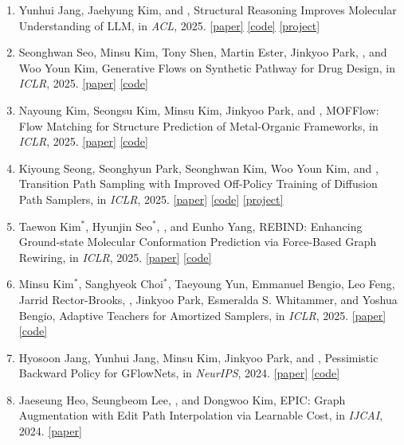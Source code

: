 \begin{enumerate}
\item Yunhui Jang, Jaehyung Kim, and , Structural Reasoning Improves Molecular Understanding of LLM, in \textit{ACL}, 2025. \mbox{\href{https://arxiv.org/abs/2410.05610}{[paper]}} \mbox{\href{https://github.com/yunhuijang/MSR}{[code]}} \mbox{\href{https://yunhuijang.github.io/projects/MSR/}{[project]}}
\item Seonghwan Seo, Minsu Kim, Tony Shen, Martin Ester, Jinkyoo Park, , and Woo Youn Kim, Generative Flows on Synthetic Pathway for Drug Design, in \textit{ICLR}, 2025. \mbox{\href{https://arxiv.org/abs/2410.04542}{[paper]}} \mbox{\href{https://github.com/SeonghwanSeo/RxnFlow}{[code]}}
\item Nayoung Kim, Seongsu Kim, Minsu Kim, Jinkyoo Park, and , MOFFlow: Flow Matching for Structure Prediction of Metal-Organic Frameworks, in \textit{ICLR}, 2025. \mbox{\href{https://arxiv.org/abs/2410.17270}{[paper]}} \mbox{\href{https://github.com/nayoung10/MOFFlow}{[code]}}
\item Kiyoung Seong, Seonghyun Park, Seonghwan Kim, Woo Youn Kim, and , Transition Path Sampling with Improved Off-Policy Training of Diffusion Path Samplers, in \textit{ICLR}, 2025. \mbox{\href{https://arxiv.org/abs/2405.19961}{[paper]}} \mbox{\href{https://github.com/kiyoung98/tps-dps}{[code]}} \mbox{\href{https://kiyoung98.github.io/tps-dps/}{[project]}}
\item Taewon Kim$^*$, Hyunjin Seo$^*$, , and Eunho Yang, REBIND: Enhancing Ground-state Molecular Conformation Prediction via Force-Based Graph Rewiring, in \textit{ICLR}, 2025. \mbox{\href{https://arxiv.org/abs/2410.14696}{[paper]}} \mbox{\href{https://github.com/holymollyhao/ReBIND}{[code]}}
\item Minsu Kim$^*$, Sanghyeok Choi$^*$, Taeyoung Yun, Emmanuel Bengio, Leo Feng, Jarrid Rector-Brooks, , Jinkyoo Park, Esmeralda S. Whitammer, and Yoshua Bengio, Adaptive Teachers for Amortized Samplers, in \textit{ICLR}, 2025. \mbox{\href{https://arxiv.org/abs/2410.01432}{[paper]}} \mbox{\href{https://github.com/alstn12088/adaptive-teacher}{[code]}}
\item Hyosoon Jang, Yunhui Jang, Minsu Kim, Jinkyoo Park, and , Pessimistic Backward Policy for GFlowNets, in \textit{NeurIPS}, 2024. \mbox{\href{https://arxiv.org/abs/2405.16012}{[paper]}} \mbox{\href{https://github.com/hsjang0/Pessimistic-Backward-Policy-for-GFlowNets}{[code]}}
\item Jaeseung Heo, Seungbeom Lee, , and Dongwoo Kim, EPIC: Graph Augmentation with Edit Path Interpolation via Learnable Cost, in \textit{IJCAI}, 2024. \mbox{\href{https://arxiv.org/abs/2306.01310}{[paper]}}

\end{enumerate}
